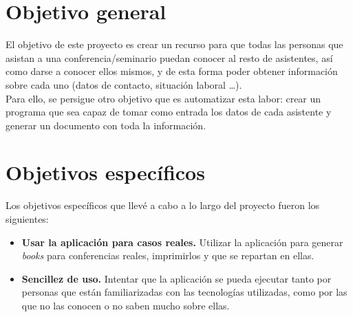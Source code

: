 \documentclass[a4paper, 12pt]{book}
\begin{document}
\section{Objetivo general} %
\label{sec:objetivo-general} %
El objetivo de este proyecto es crear un recurso para que todas las personas que asistan a una conferencia/seminario puedan conocer al resto de asistentes, así como darse a conocer ellos mismos, y de esta forma poder obtener información sobre cada uno (datos de contacto, situación laboral \ldots).\\

Para ello, se persigue otro objetivo que es automatizar esta labor: crear un programa que sea capaz de tomar como entrada los datos de cada asistente y generar un documento con toda la información.


\section{Objetivos específicos}
\label{sec:objetivos-especificos}
Los objetivos específicos que llevé a cabo a lo largo del proyecto fueron los siguientes:
\begin{itemize}
  \item \textbf{Usar la aplicación para casos reales.} Utilizar la aplicación para generar \textit{books} para conferencias reales, imprimirlos y que se repartan en ellas.
  \item \textbf{Sencillez de uso.} Intentar que la aplicación se pueda ejecutar tanto por personas que están familiarizadas con las tecnologías utilizadas, como por las que no las conocen o no saben mucho sobre ellas.
\end{itemize}
\end{document}
